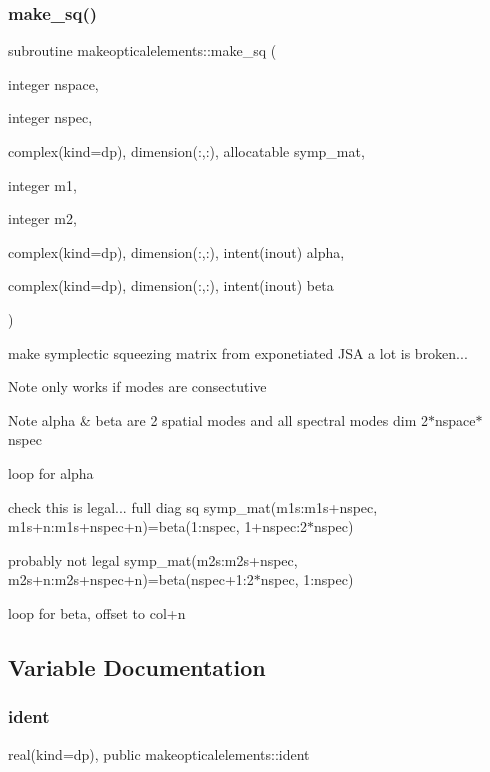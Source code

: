 \subsubsection{\texorpdfstring{make\+\_\+sq()}{make\_sq()}}
{\footnotesize\ttfamily subroutine makeopticalelements\+::make\+\_\+sq (\begin{DoxyParamCaption}\item[{integer}]{nspace,  }\item[{integer}]{nspec,  }\item[{complex(kind=dp), dimension(\+:,\+:), allocatable}]{symp\+\_\+mat,  }\item[{integer}]{m1,  }\item[{integer}]{m2,  }\item[{complex(kind=dp), dimension(\+:,\+:), intent(inout)}]{alpha,  }\item[{complex(kind=dp), dimension(\+:,\+:), intent(inout)}]{beta }\end{DoxyParamCaption})}



make symplectic squeezing matrix from exponetiated J\+SA  a lot is broken... 

\begin{DoxyNote}{Note}
only works if modes are consectutive 
\end{DoxyNote}
\begin{DoxyNote}{Note}
alpha \& beta are 2 spatial modes and all spectral modes dim 2$\ast$nspace$\ast$nspec
\end{DoxyNote}
loop for alpha

check this is legal... full diag sq symp\+\_\+mat(m1s\+:m1s+nspec, m1s+n\+:m1s+nspec+n)=beta(1\+:nspec, 1+nspec\+:2$\ast$nspec)

probably not legal symp\+\_\+mat(m2s\+:m2s+nspec, m2s+n\+:m2s+nspec+n)=beta(nspec+1\+:2$\ast$nspec, 1\+:nspec)

loop for beta, offset to col+n 

\subsection{Variable Documentation}
\mbox{\label{namespacemakeopticalelements_ab4e48a98a0fb0756bb4eff6ece9623a8}} 
\subsubsection{\texorpdfstring{ident}{ident}}
{\footnotesize\ttfamily real(kind=dp), public makeopticalelements\+::ident}

